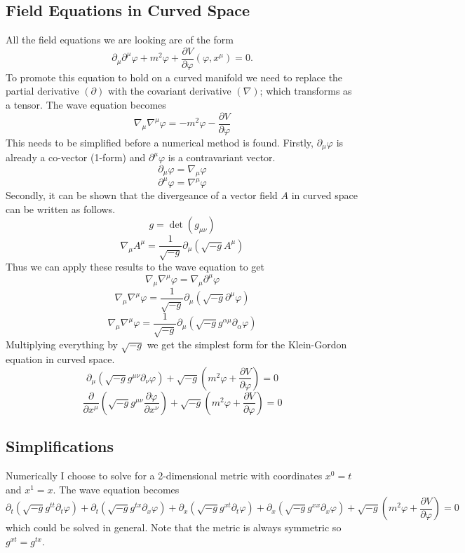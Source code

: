 \documentclass[11pt, oneside]{report}  %
\numberwithin{equation}{section}
\begin{document}
\subsection{Field Equations in Curved Space}
All the field equations we are looking are of the form
$$ \partial_\mu\partial^\mu\varphi + m^2\varphi + \frac{\partial V}{\partial \varphi}(\varphi,x^\mu)=0.$$
To promote this equation to hold on a curved manifold we need to replace the partial derivative $(\partial)$ with the covariant derivative $(\nabla)$; which transforms as a tensor. The wave equation becomes 
$$ \nabla_\mu \nabla^\mu \varphi = - m^2\varphi - \frac{\partial V}{\partial \varphi}$$
This needs to be simplified before a numerical method is found. Firstly, $\partial_\mu \varphi$ is already a co-vector (1-form) and $\partial^\mu \varphi$ is a contravariant vector. 
$$ \partial_\mu \varphi = \nabla_\mu \varphi$$
$$ \partial^\mu \varphi = \nabla^\mu \varphi$$
Secondly, it can be shown that the divergeance of a vector field $A$ in curved space can be written as follows.
$$ g = \det(g_{\mu\nu})$$
$$ \nabla_\mu A^\mu=\frac{1}{\sqrt{-g}}\partial_{\mu}\left( \sqrt{-g}A^\mu\right)$$ 
Thus we can apply these results to the wave equation to get 
$$  \nabla_\mu \nabla^\mu \varphi =  \nabla_\mu \partial^\mu \varphi$$
$$  \nabla_\mu \nabla^\mu \varphi = \frac{1}{\sqrt{-g}}\partial_{\mu}\left( \sqrt{-g}\partial^\mu\varphi\right)$$
$$  \nabla_\mu \nabla^\mu \varphi = \frac{1}{\sqrt{-g}}\partial_{\mu}\left( \sqrt{-g}g^{\alpha\mu}\partial_\alpha\varphi\right)$$
Multiplying everything by $\sqrt{-g}$ we get the simplest form for the Klein-Gordon equation in curved space.
$$ \boxed{\partial_\mu\left(\sqrt{-g}g^{\mu\nu}\partial_\nu \varphi \right) + \sqrt{-g}\left(m^2\varphi+\frac{\partial V}{\partial \varphi}\right)=0}$$
$$ \boxed{\frac{\partial}{\partial x^\mu}\left(\sqrt{-g}g^{\mu\nu}\frac{\partial \varphi}{\partial x^\nu} \right) + \sqrt{-g}\left(m^2\varphi+\frac{\partial V}{\partial \varphi}\right)=0}$$

\subsection{Simplifications}
Numerically I choose to solve for a 2-dimensional metric with coordinates $x^0 = t$ and $x^1 = x$. The wave equation becomes
$$ \partial_t\left(\sqrt{-g}g^{tt}\partial_t \varphi \right) +\partial_t\left(\sqrt{-g}g^{tx}\partial_x \varphi \right)+\partial_x\left(\sqrt{-g}g^{xt}\partial_t \varphi \right)+\partial_x\left(\sqrt{-g}g^{xx}\partial_x \varphi \right) + \sqrt{-g}\left(m^2\varphi+\frac{\partial V}{\partial \varphi}\right)=0$$
which could be solved in general. Note that the metric is always symmetric so $g^{xt} = g^{tx}$.
\end{document}
